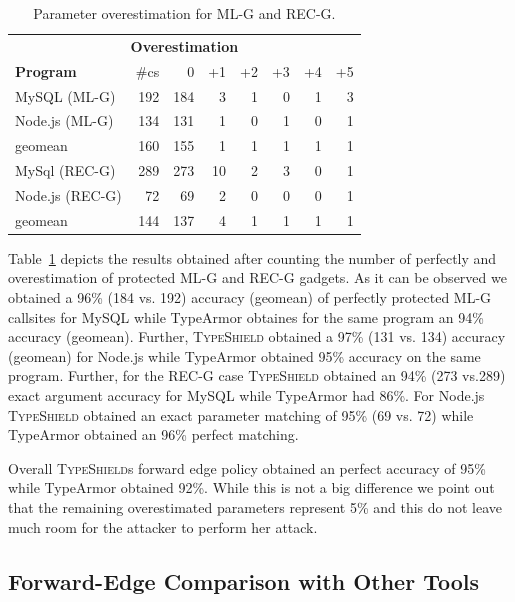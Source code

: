 \begin{table}[H]
\centering 
 \begin{tabular}{ l | r | r | r | r | r | r | r } 
                         \multicolumn{8}{c}{\hspace{3.3cm}\textbf{Overestimation}} \\
  \textbf{Program}& \#cs & 0    & +1  & +2  & +3  & +4  & +5  \\\hline 
  MySQL (ML-G)    & 192  & 184  & 3   & 1   & 0   & 1   & 3   \\
  Node.js (ML-G)  & 134  & 131  & 1   & 0   & 1   & 0   & 1   \\
  geomean         & 160  & 155  & 1   & 1   & 1   & 1   & 1   \\\hline
  MySql (REC-G)   & 289  & 273  & 10  & 2   & 3   & 0   & 1   \\
  Node.js (REC-G) & 72   & 69   & 2   & 0   & 0   & 0   & 1   \\
  geomean         & 144  & 137  & 4   & 1   & 1   & 1   & 1   \\\hline
\end{tabular}
\caption{Parameter overestimation for ML-G and REC-G.}
\label{Parameter overestimation for ML-G and REC-G.}
\vspace{-.5cm}
\end{table}
Table~\ref{Parameter overestimation for ML-G and REC-G.} depicts the results obtained
after counting the number of perfectly and overestimation of protected ML-G and 
REC-G gadgets. As it can be observed we obtained a
96\% (184 vs. 192) accuracy (geomean) of perfectly protected ML-G callsites for MySQL while
TypeArmor obtaines for the same program an 94\% accuracy (geomean). Further,
\textsc{TypeShield} obtained a 97\% (131 vs. 134) accuracy (geomean) for Node.js while TypeArmor
obtained 95\% accuracy on the same program.
Further, for the REC-G case \textsc{TypeShield} obtained an
94\% (273 vs.289) exact argument accuracy for MySQL while TypeArmor had 86\%.
For Node.js \textsc{TypeShield} obtained an exact parameter 
matching of 95\% (69 vs. 72) while TypeArmor obtained an 96\% perfect matching.

Overall \textsc{TypeShield}s forward edge policy obtained an perfect accuracy 
of 95\% while TypeArmor obtained 92\%. While this is not a big difference
we point out that the remaining overestimated parameters represent 5\% and this 
do not leave much room for the attacker to perform her attack.

\subsection{Forward-Edge Comparison with Other Tools}
\label{RQ9: Is TypeShield better than other tools?}
\vspace{-.5cm}

